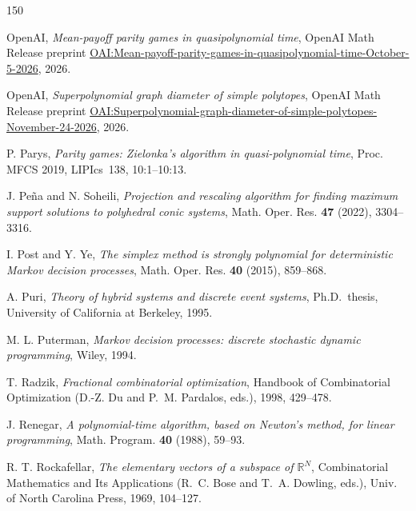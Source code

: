 \begin{thebibliography}{150}
{\raggedright OpenAI, \emph{Mean-payoff parity games in quasipolynomial time},
OpenAI Math Release preprint
\href{https://github.com/openai/math/blob/main/preprints/Mean-payoff-parity-games-in-quasipolynomial-time-October-5-2026/mean-payoff-parity.pdf}{{\ttfamily OAI:Mean-\allowbreak{}payoff-\allowbreak{}parity-\allowbreak{}games-\allowbreak{}in-\allowbreak{}quasipolynomial-\allowbreak{}time-\allowbreak{}October-\allowbreak{}5-\allowbreak{}2026}}, 2026.\par}

{\raggedright OpenAI, \emph{Superpolynomial graph diameter of simple polytopes},
OpenAI Math Release preprint
\href{https://github.com/openai/math/blob/main/preprints/Superpolynomial-graph-diameter-of-simple-polytopes-November-24-2026/paper.pdf}{{\ttfamily OAI:Superpolynomial-\allowbreak{}graph-\allowbreak{}diameter-\allowbreak{}of-\allowbreak{}simple-\allowbreak{}polytopes-\allowbreak{}November-\allowbreak{}24-\allowbreak{}2026}}, 2026.\par}

P. Parys, \emph{Parity games: Zielonka's algorithm in quasi-polynomial time}, Proc. MFCS 2019, LIPIcs~138, 10:1--10:13.

J. Pe\~na and N. Soheili, \emph{Projection and rescaling algorithm for finding maximum support solutions to polyhedral conic systems}, Math. Oper. Res. \textbf{47} (2022), 3304--3316.

I. Post and Y. Ye, \emph{The simplex method is strongly polynomial for deterministic Markov decision processes}, Math. Oper. Res. \textbf{40} (2015), 859--868.

A. Puri, \emph{Theory of hybrid systems and discrete event systems}, Ph.D.\ thesis, University of California at Berkeley, 1995.

M. L. Puterman, \emph{Markov decision processes: discrete stochastic dynamic programming}, Wiley, 1994.

T. Radzik, \emph{Fractional combinatorial optimization}, Handbook of Combinatorial Optimization (D.-Z. Du and P.~M. Pardalos, eds.), 1998, 429--478.

J. Renegar, \emph{A polynomial-time algorithm, based on Newton's method, for linear programming}, Math. Program. \textbf{40} (1988), 59--93.

R. T. Rockafellar, \emph{The elementary vectors of a subspace of \(\mathbb R^N\)}, Combinatorial Mathematics and Its Applications (R.~C. Bose and T.~A. Dowling, eds.), Univ. of North Carolina Press, 1969, 104--127.


\end{thebibliography}
